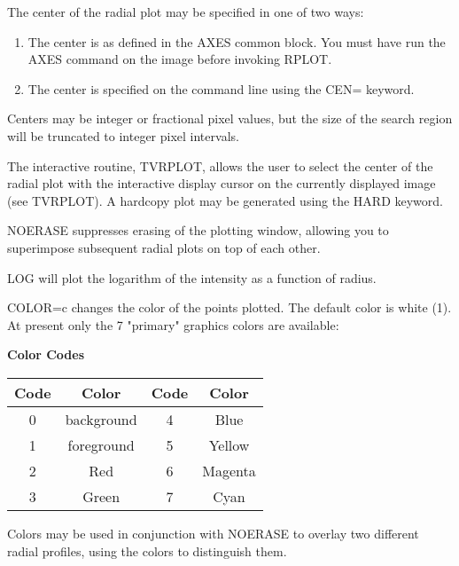 The center of the radial plot may be specified in one of two ways:
\begin{enumerate}
  \item{The center is as defined in the AXES common block.  You
        must have run the AXES command on the image before invoking
        RPLOT.}
  \item{The center is specified on the command line using the CEN= keyword.}
\end{enumerate}

Centers may be integer or fractional pixel values, but the size of the
search region will be truncated to integer pixel intervals.

The interactive routine, TVRPLOT, allows the user to select the center of
the radial plot with the interactive display cursor on the currently
displayed image (see TVRPLOT).  A hardcopy plot may be generated using the
HARD keyword.

NOERASE suppresses erasing of the plotting window, allowing you to
superimpose subsequent radial plots on top of each other.  

LOG will plot the logarithm of the intensity as a function of radius.

COLOR=c changes
the color of the points plotted.  The default color is white (1).  At
present only the 7 "primary" graphics colors are available:

\begin{center}
{\bf Color Codes}\\
\begin{tabular}{cccc}
\hline
Code & Color & Code & Color\\
\hline
0 & background & 4 & Blue\\    
1 & foreground & 5 & Yellow\\  
2 & Red        & 6 & Magenta\\ 
3 & Green      & 7 & Cyan\\    
\hline
\end{tabular}
\end{center}

Colors may be used in conjunction with NOERASE to overlay two different
radial profiles, using the colors to distinguish them.

